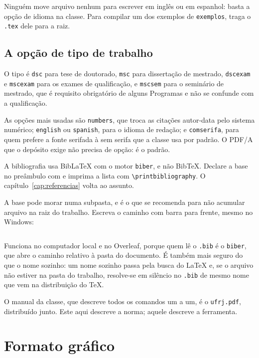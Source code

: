 \documentclass[dsc]{ufrj}
\begin{document}
  Ninguém move arquivo nenhum para escrever em inglês ou em espanhol: basta a
  opção de idioma na classe. Para compilar um dos exemplos de \verb|exemplos|,
  traga o \verb|.tex| dele para a raiz.

  \section{A opção de tipo de trabalho}

  O tipo é \verb|dsc| para tese de doutorado, \verb|msc| para dissertação de
  mestrado, \verb|dscexam| e \verb|mscexam| para os exames de qualificação, e
  \verb|mscsem| para o seminário de mestrado, que é requisito obrigatório de
  alguns Programas e não se confunde com a qualificação.

  As opções mais usadas são \verb|numbers|, que troca as citações autor-data
  pelo sistema numérico; \verb|english| ou \verb|spanish|, para o idioma de
  redação; e \verb|comserifa|, para quem prefere a fonte serifada à sem serifa
  que a classe usa por padrão. O PDF/A que o depósito exige não precisa de
  opção: é o padrão.

  A bibliografia usa BibLaTeX com o motor \texttt{biber}, e não BibTeX. Declare
  a base no preâmbulo com \verb|| e imprima a lista
  com \verb|\printbibliography|. O capítulo~\ref{cap:referencias} volta ao
  assunto.

  A base pode morar numa subpasta, e é o que se recomenda para não acumular
  arquivo na raiz do trabalho. Escreva o caminho com barra para frente, mesmo
  no Windows:

\begin{verbatim}

\end{verbatim}

  \noindent Funciona no computador local e no Overleaf, porque quem lê o
  \texttt{.bib} é o \texttt{biber}, que abre o caminho relativo à pasta do
  documento. É também mais seguro do que o nome sozinho: um nome sozinho passa
  pela busca do \LaTeX{} e, se o arquivo não estiver na pasta do trabalho,
  resolve-se em silêncio no \texttt{.bib} de mesmo nome que vem na distribuição
  do \TeX.

  O manual da classe, que descreve todos os comandos um a um, é o
  \texttt{ufrj.pdf}, distribuído junto. Este aqui descreve a norma; aquele
  descreve a ferramenta.

  \chapter{Formato gráfico}
\end{document}
